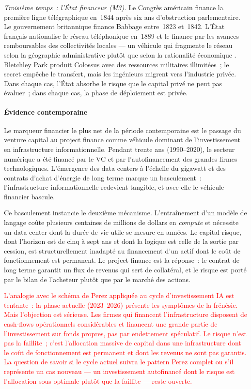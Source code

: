 \emph{Troisième temps~: l'État financeur (M3).} Le Congrès américain finance la première ligne télégraphique en~1844 après six ans d'obstruction parlementaire. Le gouvernement britannique finance Babbage entre~1823 et~1842. L'État français nationalise le réseau téléphonique en~1889 et le finance par les \og avances remboursables\fg{} des collectivités locales --- un véhicule qui fragmente le réseau selon la géographie administrative plutôt que selon la rationalité économique \parencite{bertho_histoire_1984}. Bletchley Park produit Colossus avec des ressources militaires illimitées~; le secret empêche le transfert, mais les ingénieurs migrent vers l'industrie privée. Dans chaque cas, l'État absorbe le risque que le capital privé ne peut pas évaluer~; dans chaque cas, la phase de déploiement est privée.


\paragraph{Évidence contemporaine}

Le marqueur financier le plus net de la période contemporaine est le passage du venture capital au project finance comme véhicule dominant de l'investissement en infrastructure informationnelle. Pendant trente ans (1990--2020), le secteur numérique a été financé par le VC et par l'autofinancement des grandes firmes technologiques. L'émergence des data centers à l'échelle du gigawatt et des contrats d'achat d'énergie de long terme marque un basculement~: l'infrastructure informationnelle redevient tangible, et avec elle le véhicule financier bascule.

Ce basculement instancie le deuxième mécanisme. L'entraînement d'un modèle de langage coûte plusieurs centaines de millions de dollars en \emph{compute} et nécessite un data center dont la durée de vie utile se mesure en années. Le capital-risque, dont l'horizon est de cinq à sept ans et dont la logique est celle de la sortie par cession, est structurellement inadapté au financement d'un actif dont le coût de fonctionnement est permanent. Le project finance est la réponse~: le contrat de long terme garantit un flux de revenus qui sert de collatéral, et le risque est porté par le bilan de l'acheteur plutôt que par le marché des actions.

\textcolor{red}{L'analogie avec le schéma de Perez appliquée au cycle d'investissement IA est tentante~: la phase actuelle (2023--2026) présente les symptômes de la frénésie. Mais l'objection est sérieuse. Les firmes qui financent l'infrastructure disposent de cash-flows opérationnels considérables et financent une grande partie de l'investissement sur fonds propres, pas par endettement spéculatif. Le risque n'est pas la faillite~; c'est l'allocation massive de capital dans une infrastructure dont le coût de fonctionnement est permanent et dont les revenus ne sont pas garantis. La question de savoir si le cycle actuel suivra le pattern Perez complet ou s'il représente un cas nouveau --- un investissement autofinancé dont le risque est l'allocation sous-optimale plutôt que la faillite --- reste ouverte.}

